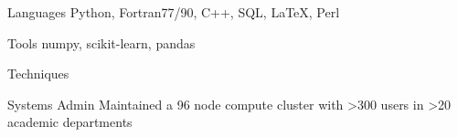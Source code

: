 


\begin{cvskills}








\cvskill
{Languages} %
{Python, Fortran77/90, C++, SQL, LaTeX, Perl} %


\cvskill
{Tools} %
{numpy, scikit-learn, pandas} %



\cvskill
{Techniques} %
{} %


\cvskill
{Systems Admin} %
{Maintained a 96 node compute cluster with >300 users in >20 academic departments} %




\end{cvskills}
